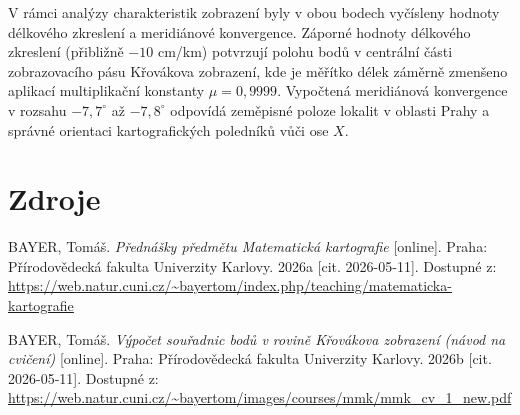 \documentclass[12pt]{article}
\begin{document}
V rámci analýzy charakteristik zobrazení byly v obou bodech vyčísleny hodnoty délkového zkreslení a meridiánové konvergence. Záporné hodnoty délkového zkreslení (přibližně $-10$ cm/km) potvrzují polohu bodů v centrální části zobrazovacího pásu Křovákova zobrazení, kde je měřítko délek záměrně zmenšeno aplikací multiplikační konstanty $\mu = 0,9999$. Vypočtená meridiánová konvergence v rozsahu $-7,7^\circ$ až $-7,8^\circ$ odpovídá zeměpisné poloze lokalit v oblasti Prahy a správné orientaci kartografických poledníků vůči ose $X$.

\newpage
\section{Zdroje}
BAYER, Tomáš. \textit{Přednášky předmětu Matematická kartografie} [online]. Praha: Přírodovědecká fakulta Univerzity Karlovy. 2026a [cit. 2026-05-11]. Dostupné z: \url{https://web.natur.cuni.cz/~bayertom/index.php/teaching/matematicka-kartografie}

BAYER, Tomáš. \textit{Výpočet souřadnic bodů v rovině Křovákova zobrazení (návod na cvičení)} [online]. Praha: Přírodovědecká fakulta Univerzity Karlovy. 2026b [cit. 2026-05-11]. Dostupné z: \url{https://web.natur.cuni.cz/~bayertom/images/courses/mmk/mmk_cv_1_new.pdf}
\end{document}
